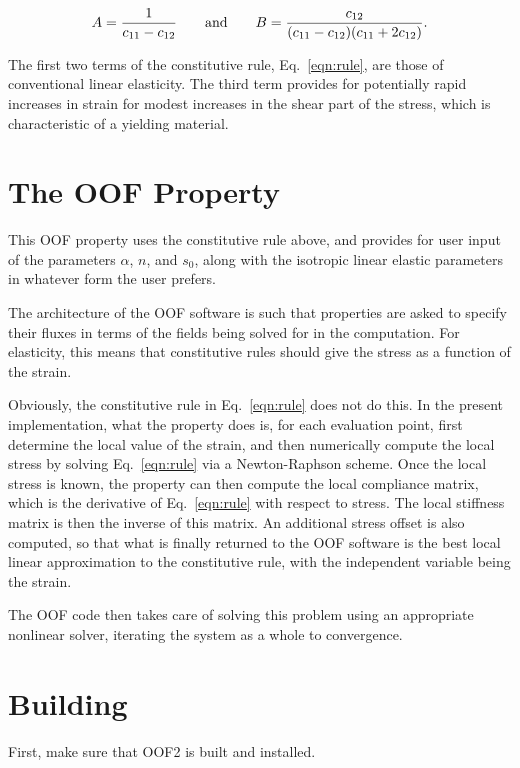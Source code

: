 \documentclass[10pt]{article}
\begin{document}
\begin{equation}
A={1 \over c_{11}-c_{12}} \qquad\mathrm{and}\qquad 
B={c_{12} \over (c_{11}-c_{12})(c_{11}+2c_{12})}.
\end{equation}

The first two terms of the constitutive rule, Eq.~\ref{eqn:rule}, are
those of conventional linear elasticity.  The third term provides for
potentially rapid increases in strain for modest increases in the
shear part of the stress, which is characteristic of a yielding
material.

\section{The OOF Property}

This OOF property uses the constitutive rule above, and provides for
user input of the parameters $\alpha$, $n$, and $s_0$, along with the
isotropic linear elastic parameters in whatever form the user prefers.

The architecture of the OOF software is such that properties are asked
to specify their fluxes in terms of the fields being solved for in the
computation. For elasticity, this means that constitutive rules should
give the stress as a function of the strain.

Obviously, the constitutive rule in Eq.~\ref{eqn:rule} does not do
this.  In the present implementation, what the property does is, for
each evaluation point, first determine the local value of the strain,
and then numerically compute the local stress by solving
Eq.~\ref{eqn:rule} via a Newton-Raphson scheme.  Once the local stress
is known, the property can then compute the local compliance matrix,
which is the derivative of Eq.~\ref{eqn:rule} with respect to stress.
The local stiffness matrix is then the inverse of this matrix.  An
additional stress offset is also computed, so that what is finally
returned to the OOF software is the best local linear approximation to
the constitutive rule, with the independent variable being the strain.

The OOF code then takes care of solving this problem using an
appropriate nonlinear solver, iterating the system as a whole to
convergence.

\section{Building}

First, make sure that OOF2 is built and installed.
\end{document}
